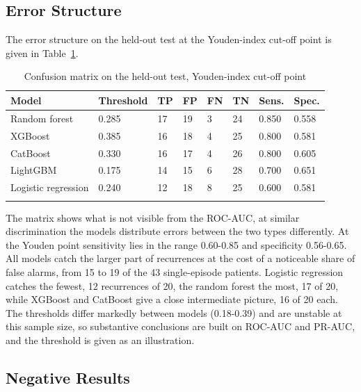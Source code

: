 \documentclass[pdflatex,sn-basic,Numbered]{sn-jnl}
\begin{document}
\subsection{Error Structure}\label{subsec3_4}

The error structure on the held-out test at the Youden-index cut-off point is given in Table~\ref{tab4}.

\begin{table}[h]
\caption{Confusion matrix on the held-out test, Youden-index cut-off point}\label{tab4}%
\begin{tabular}{@{}llllllll@{}}
\toprule
Model & Threshold & TP & FP & FN & TN & Sens. & Spec.\\
\midrule
Random forest & 0.285 & 17 & 19 & 3 & 24 & 0.850 & 0.558\\
XGBoost & 0.385 & 16 & 18 & 4 & 25 & 0.800 & 0.581\\
CatBoost & 0.330 & 16 & 17 & 4 & 26 & 0.800 & 0.605\\
LightGBM & 0.175 & 14 & 15 & 6 & 28 & 0.700 & 0.651\\
Logistic regression & 0.240 & 12 & 18 & 8 & 25 & 0.600 & 0.581\\
\botrule
\end{tabular}
\end{table}

The matrix shows what is not visible from the ROC-AUC, at similar discrimination the models distribute errors between the two types differently. At the Youden point sensitivity lies in the range 0.60-0.85 and specificity 0.56-0.65. All models catch the larger part of recurrences at the cost of a noticeable share of false alarms, from 15 to 19 of the 43 single-episode patients. Logistic regression catches the fewest, 12 recurrences of 20, the random forest the most, 17 of 20, while XGBoost and CatBoost give a close intermediate picture, 16 of 20 each. The thresholds differ markedly between models (0.18-0.39) and are unstable at this sample size, so substantive conclusions are built on ROC-AUC and PR-AUC, and the threshold is given as an illustration.

\subsection{Negative Results}\label{subsec3_5}
\end{document}
